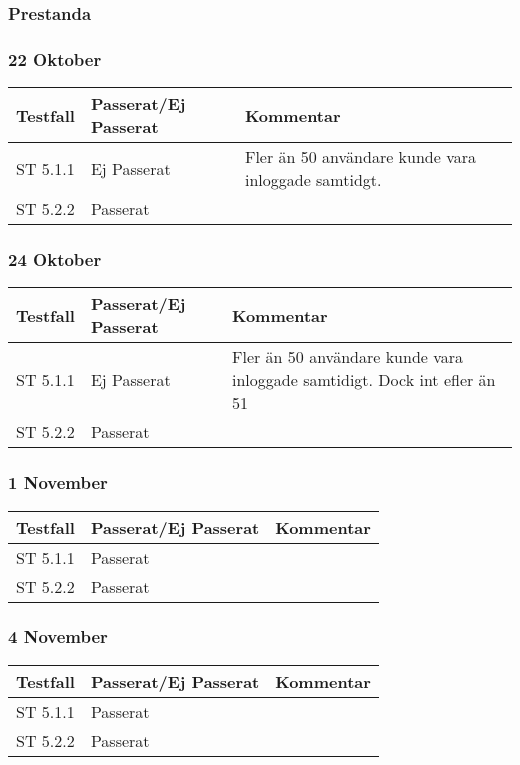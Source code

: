 \documentclass[a4paper]{article}
\begin{document}
\subsubsection{Prestanda}

\subsubsection{22 Oktober}
\begin{tabular}{| l | l | p{9cm} |}
\hline
Testfall &  Passerat/Ej Passerat & Kommentar\\
\hline
ST 5.1.1 & Ej Passerat & Fler än 50 användare kunde vara inloggade samtidgt.\\
\hline
ST 5.2.2 & Passerat &\\
\hline
\end{tabular}

\subsubsection{24 Oktober}
\begin{tabular}{| l | l | p{9cm} |}
\hline
Testfall &  Passerat/Ej Passerat & Kommentar\\
\hline
ST 5.1.1 & Ej Passerat & Fler än 50 användare kunde vara inloggade samtidigt. Dock int efler än 51\\
\hline
ST 5.2.2 & Passerat & \\
\hline
\end{tabular}

\subsubsection{1 November}
\begin{tabular}{| l | l | p{9cm} |}
\hline
Testfall &  Passerat/Ej Passerat & Kommentar\\
\hline
ST 5.1.1 & Passerat & \\
\hline
ST 5.2.2 & Passerat & \\
\hline
\end{tabular}

\subsubsection{4 November}
\begin{tabular}{| l | l | p{9cm} |}
\hline
Testfall &  Passerat/Ej Passerat & Kommentar\\
\hline
ST 5.1.1 & Passerat & \\
\hline
ST 5.2.2 & Passerat & \\
\hline
\end{tabular}

\end{document}
